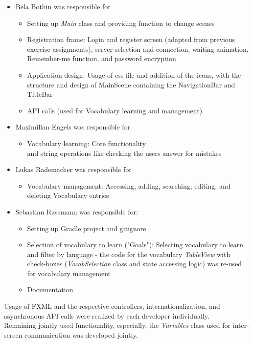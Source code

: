 \begin{itemize}
    \item Bela Bothin was responsible for %
    \begin{itemize}
        \item Setting up \textit{Main} class and providing function to change scenes
        \item Registration frame: Login and register screen (adapted from previous exercise assignments), server selection and connection, waiting animation, Remember-me function, and password encryption
        \item Application design: Usage of css file and addition of the icons, with the structure and design of MainScene containing the NavigationBar and TitleBar
        \item API calls (used for Vocabulary learning and management)
    \end{itemize}
\item Maximilian Engels was responsible for %
    \begin{itemize}
        \item Vocabulary learning: Core functionality\\
        and string operations like checking the users answer for mistakes
    \end{itemize}
\item Lukas Rademacher was responsible for %
    \begin{itemize}
        \item Vocabulary management: Accessing, adding, searching, editing, and deleting Vocabulary entries
    \end{itemize}
\item Sebastian Rassmann was responsible for: %
    \begin{itemize}
        \item Setting up Gradle project and gitignore
        \item Selection of vocabulary to learn ("Goals"): Selecting vocabulary to learn and filter by language - the code for the vocabulary \textit{TableView} with check-boxes (\textit{VocabSelection} class and state accessing logic) was re-used for vocabulary management
        \item Documentation
    \end{itemize}
\end{itemize}

Usage of FXML and the respective controllers, internationalization, and asynchronous API calls were realized by each developer individually. \\
Remaining jointly used functionality, especially, the \textit{Variables} class used for inter-screen communication was developed jointly. 


